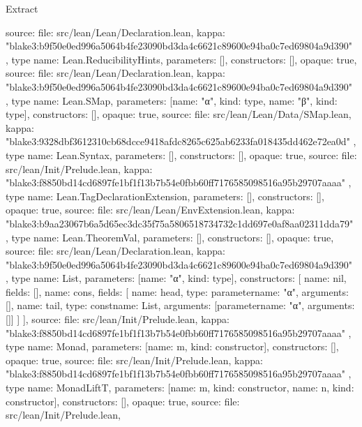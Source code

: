 \begin{lexlean}{Extract}
\begin{toolingmodule}
{{      source: {
        file: src/lean/Lean/Declaration.lean,
        kappa: "blake3:b9f50e0ed996a5064b4fe23090bd3da4c6621c89600e94ba0c7ed69804a9d390"
      }
    },
    type{
      name: Lean.ReducibilityHints,
      parameters: [],
      constructors: [],
      opaque: true,
      source: {
        file: src/lean/Lean/Declaration.lean,
        kappa: "blake3:b9f50e0ed996a5064b4fe23090bd3da4c6621c89600e94ba0c7ed69804a9d390"
      }
    },
    type{
      name: Lean.SMap,
      parameters: [{name: "α", kind: type{}}, {name: "β", kind: type{}}],
      constructors: [],
      opaque: true,
      source: {
        file: src/lean/Lean/Data/SMap.lean,
        kappa: "blake3:9328dbf3612310cb68dcce9418afdc8265c625ab6233fa018435dd462e72ea0d"
      }
    },
    type{
      name: Lean.Syntax,
      parameters: [],
      constructors: [],
      opaque: true,
      source: {
        file: src/lean/Init/Prelude.lean,
        kappa: "blake3:f8850bd14cd6897fe1bf1f13b7b54e0fbb60ff7176585098516a95b29707aaaa"
      }
    },
    type{
      name: Lean.TagDeclarationExtension,
      parameters: [],
      constructors: [],
      opaque: true,
      source: {
        file: src/lean/Lean/EnvExtension.lean,
        kappa: "blake3:b9aa23067b6a5d65ec3dc35f75a5806518734732c1dd697e0af8aa02311dda79"
      }
    },
    type{
      name: Lean.TheoremVal,
      parameters: [],
      constructors: [],
      opaque: true,
      source: {
        file: src/lean/Lean/Declaration.lean,
        kappa: "blake3:b9f50e0ed996a5064b4fe23090bd3da4c6621c89600e94ba0c7ed69804a9d390"
      }
    },
    type{
      name: List,
      parameters: [{name: "α", kind: type{}}],
      constructors: [
        {name: nil, fields: []},
        {
          name: cons,
          fields: [
            {name: head, type: parameter{name: "α", arguments: []}},
            {name: tail, type: const{name: List, arguments: [parameter{name: "α", arguments: []}]}}
          ]
        }
      ],
      source: {
        file: src/lean/Init/Prelude.lean,
        kappa: "blake3:f8850bd14cd6897fe1bf1f13b7b54e0fbb60ff7176585098516a95b29707aaaa"
      }
    },
    type{
      name: Monad,
      parameters: [{name: m, kind: constructor{}}],
      constructors: [],
      opaque: true,
      source: {
        file: src/lean/Init/Prelude.lean,
        kappa: "blake3:f8850bd14cd6897fe1bf1f13b7b54e0fbb60ff7176585098516a95b29707aaaa"
      }
    },
    type{
      name: MonadLiftT,
      parameters: [{name: m, kind: constructor{}}, {name: n, kind: constructor{}}],
      constructors: [],
      opaque: true,
      source: {
        file: src/lean/Init/Prelude.lean,
}}}
\end{toolingmodule}
\end{lexlean}

